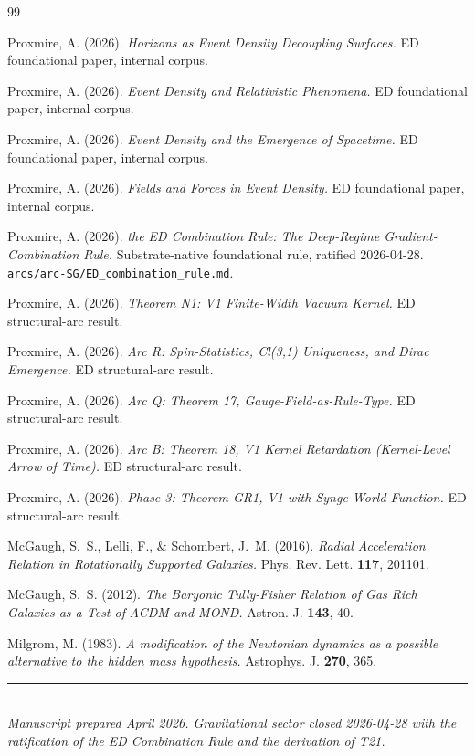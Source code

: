 \documentclass[11pt,a4paper]{article}
\begin{document}
\begin{thebibliography}{99}

 Proxmire, A. (2026). \emph{Horizons as Event Density Decoupling Surfaces.} ED foundational paper, internal corpus.

 Proxmire, A. (2026). \emph{Event Density and Relativistic Phenomena.} ED foundational paper, internal corpus.

 Proxmire, A. (2026). \emph{Event Density and the Emergence of Spacetime.} ED foundational paper, internal corpus.

 Proxmire, A. (2026). \emph{Fields and Forces in Event Density.} ED foundational paper, internal corpus.

 Proxmire, A. (2026). \emph{the ED Combination Rule: The Deep-Regime Gradient-Combination Rule.} Substrate-native foundational rule, ratified 2026-04-28. \texttt{arcs/arc-SG/ED\_combination\_rule.md}.

 Proxmire, A. (2026). \emph{Theorem N1: V1 Finite-Width Vacuum Kernel.} ED structural-arc result.

 Proxmire, A. (2026). \emph{Arc R: Spin-Statistics, Cl(3,1) Uniqueness, and Dirac Emergence.} ED structural-arc result.

 Proxmire, A. (2026). \emph{Arc Q: Theorem 17, Gauge-Field-as-Rule-Type.} ED structural-arc result.

 Proxmire, A. (2026). \emph{Arc B: Theorem 18, V1 Kernel Retardation (Kernel-Level Arrow of Time).} ED structural-arc result.

 Proxmire, A. (2026). \emph{Phase 3: Theorem GR1, V1 with Synge World Function.} ED structural-arc result.

 McGaugh, S.~S., Lelli, F., \& Schombert, J.~M. (2016). \emph{Radial Acceleration Relation in Rotationally Supported Galaxies.} Phys. Rev. Lett. \textbf{117}, 201101.

 McGaugh, S.~S. (2012). \emph{The Baryonic Tully-Fisher Relation of Gas Rich Galaxies as a Test of $\Lambda$CDM and MOND.} Astron. J. \textbf{143}, 40.

 Milgrom, M. (1983). \emph{A modification of the Newtonian dynamics as a possible alternative to the hidden mass hypothesis.} Astrophys. J. \textbf{270}, 365.

\end{thebibliography}

\vfill
\noindent\rule{\textwidth}{0.4pt}\\
\textit{Manuscript prepared April 2026. Gravitational sector closed 2026-04-28 with the ratification of the ED Combination Rule and the derivation of T21.}
\end{document}
